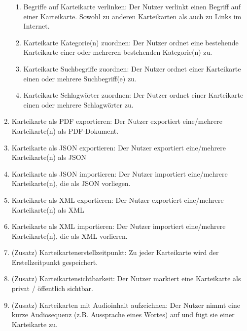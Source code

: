 \documentclass[fontsize=12pt,paper=a4,twoside]{scrartcl}
\begin{document}
\begin{enumerate}[label={N\arabic*}]
\begin{enumerate}[label*={-\arabic*}]
		\item Begriffe auf Karteikarte verlinken: Der Nutzer verlinkt einen Begriff auf einer Karteikarte. Sowohl zu anderen Karteikarten als auch zu Links im Internet.
		\item Karteikarte Kategorie(n) zuordnen: Der Nutzer ordnet eine bestehende Karteikarte einer oder mehreren bestehenden Kategorie(n) zu.
		\item Karteikarte Suchbegriffe zuordnen: Der Nutzer ordnet einer Karteikarte einen oder mehrere Suchbegriff(e) zu.
		\item Karteikarte Schlagwörter zuordnen: Der Nutzer ordnet einer Karteikarte einen oder mehrere Schlagwörter zu.
	\end{enumerate}

	\item Karteikarte als PDF exportieren: Der Nutzer exportiert eine/mehrere Karteikarte(n) als PDF-Dokument.
	\label{N4}
	\item Karteikarte als JSON exportieren: Der Nutzer exportiert eine/mehrere Karteikarte(n) als JSON
	\label{N5}
	\item Karteikarte als JSON importieren: Der Nutzer importiert eine/mehrere Karteikarte(n), die als JSON vorliegen.
	\item Karteikarte als XML exportieren: Der Nutzer exportiert eine/mehrere Karteikarte(n) als XML
	\label{N7}
	\item Karteikarte als XML importieren: Der Nutzer importiert eine/mehrere Karteikarte(n), die als XML vorlieren.

	\item (Zusatz) Karteikartenerstellzeitpunkt: Zu jeder Karteikarte wird der Erstellzeitpunkt gespeichert.
	\item (Zusatz) Karteikartensichtbarkeit: Der Nutzer markiert eine Karteikarte als privat / öffentlich sichtbar.
	\item (Zusatz) Karteikarten mit Audioinhalt aufzeichnen: Der Nutzer nimmt eine kurze Audiosequenz (z.B. Aussprache eines Wortes) auf und fügt sie einer Karteikarte zu.
\end{enumerate}
\end{document}

